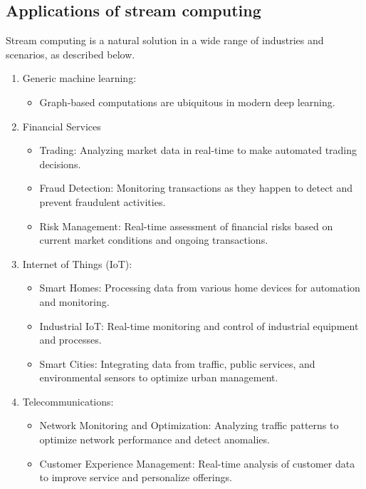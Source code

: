 \documentclass[11pt, reqno]{amsart}
\theoremstyle{definition}
\theoremstyle{remark}
\begin{document}
\subsection{Applications of stream computing}

Stream computing is a natural solution in a wide range of industries and
scenarios, as described below.

\begin{enumerate}
  \item Generic machine learning:
        \begin{itemize}
          \item Graph-based computations are ubiquitous in modern deep learning.
        \end{itemize}

  \item Financial Services
        \begin{itemize}
          \item Trading: Analyzing market data in real-time to make automated trading
                decisions.
          \item Fraud Detection: Monitoring transactions as they happen to detect and
                prevent fraudulent activities.
          \item Risk Management: Real-time assessment of financial risks based on
                current market conditions and ongoing transactions.
        \end{itemize}

  \item Internet of Things (IoT):
        \begin{itemize}
          \item Smart Homes: Processing data from various home devices for automation
                and monitoring.
          \item Industrial IoT: Real-time monitoring and control of industrial
                equipment and processes.
          \item Smart Cities: Integrating data from traffic, public services, and
                environmental sensors to optimize urban management.
        \end{itemize}

  \item Telecommunications:
        \begin{itemize}
          \item Network Monitoring and Optimization: Analyzing traffic patterns to
                optimize network performance and detect anomalies.
          \item Customer Experience Management: Real-time analysis of customer data to
                improve service and personalize offerings.
        \end{itemize}


\end{enumerate}
\end{document}
